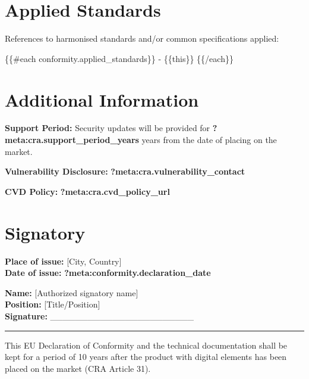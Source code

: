 \documentclass[
  11 pt,
  a4paper,
  table]{report}
\begin{document}
\section{Applied Standards}\label{applied-standards}

References to harmonised standards and/or common specifications applied:

\{\{\#each conformity.applied\_standards\}\} - \{\{this\}\}
\{\{/each\}\}

\section{Additional Information}\label{additional-information}

\textbf{Support Period:} Security updates will be provided for
\textbf{?meta:cra.support\_period\_years} years from the date of placing
on the market.

\textbf{Vulnerability Disclosure:}
\textbf{?meta:cra.vulnerability\_contact}

\textbf{CVD Policy:} \textbf{?meta:cra.cvd\_policy\_url}

\section{Signatory}\label{signatory}

\textbf{Place of issue:} {[}City, Country{]}\\
\textbf{Date of issue:} \textbf{?meta:conformity.declaration\_date}

\textbf{Name:} {[}Authorized signatory name{]}\\
\textbf{Position:} {[}Title/Position{]}\\
\textbf{Signature:} \_\_\_\_\_\_\_\_\_\_\_\_\_\_\_\_\_\_\_\_\_\_\_

\begin{center}\rule{0.5\linewidth}{0.5pt}\end{center}

\begin{tcolorbox}[enhanced jigsaw, coltitle=black, bottomrule=.15mm, colback=white, leftrule=.75mm, opacitybacktitle=0.6, rightrule=.15mm, opacityback=0, arc=.35mm, toprule=.15mm, colframe=quarto-callout-note-color-frame, breakable, left=2mm, colbacktitle=quarto-callout-note-color!10!white, titlerule=0mm, bottomtitle=1mm, toptitle=1mm, title=\textcolor{quarto-callout-note-color}{\faInfo}\hspace{0.5em}{Document Retention}]

This EU Declaration of Conformity and the technical documentation shall
be kept for a period of 10 years after the product with digital elements
has been placed on the market (CRA Article 31).

\end{tcolorbox}
\end{document}
